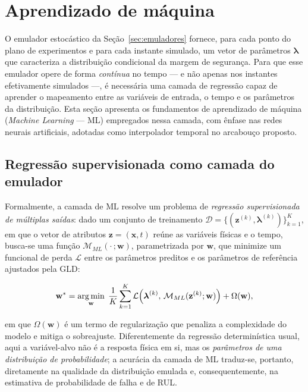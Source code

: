 \section{Aprendizado de m\'aquina}\label{sec:ml}


O emulador estocástico da Seção~\ref{sec:emuladores} fornece, para cada ponto do plano de experimentos e para cada instante simulado, um vetor de parâmetros $\boldsymbol{\lambda}$ que caracteriza a distribuição condicional da margem de segurança. Para que esse emulador opere de forma \textit{contínua} no tempo --- e não apenas nos instantes efetivamente simulados ---, é necessária uma camada de regressão capaz de aprender o mapeamento entre as variáveis de entrada, o tempo e os parâmetros da distribuição. Esta seção apresenta os fundamentos de aprendizado de máquina (\textit{Machine Learning} --- ML) empregados nessa camada, com ênfase nas redes neurais artificiais, adotadas como interpolador temporal no arcabouço proposto.

\subsection{Regress\~ao supervisionada como camada do emulador}
\label{subsec:ml_fundamentos}

Formalmente, a camada de ML resolve um problema de \textit{regressão supervisionada de múltiplas saídas}: dado um conjunto de treinamento $\mathcal{D} = \{(\mathbf{z}^{(k)}, \boldsymbol{\lambda}^{(k)})\}_{k=1}^{K}$, em que o vetor de atributos $\mathbf{z} = (\mathbf{x}, t)$ reúne as variáveis físicas e o tempo, busca-se uma função $\mathcal{M}_{ML}(\cdot\,;\mathbf{w})$, parametrizada por $\mathbf{w}$, que minimize um funcional de perda $\mathcal{L}$ entre os parâmetros preditos e os parâmetros de referência ajustados pela GLD:

\begin{equation}
\mathbf{w}^{*} = \operatorname*{arg\,min}_{\mathbf{w}} \; \frac{1}{K}\sum_{k=1}^{K} \mathcal{L}\!\left(\boldsymbol{\lambda}^{(k)},\, \mathcal{M}_{ML}(\mathbf{z}^{(k)};\mathbf{w})\right) + \Omega(\mathbf{w}),
\label{eq:ml_treinamento}
\end{equation}

\noindent em que $\Omega(\mathbf{w})$ é um termo de regularização que penaliza a complexidade do modelo e mitiga o sobreajuste. Diferentemente da regressão determinística usual, aqui a variável-alvo não é a resposta física em si, mas os \textit{parâmetros de uma distribuição de probabilidade}; a acurácia da camada de ML traduz-se, portanto, diretamente na qualidade da distribuição emulada e, consequentemente, na estimativa de probabilidade de falha e de RUL.

